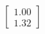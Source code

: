\documentclass[preview]{standalone}
\begin{document}
\begin{align*}
\begin{bmatrix} 1.00 \\ 1.32 \end{bmatrix}
\end{align*}
\end{document}
